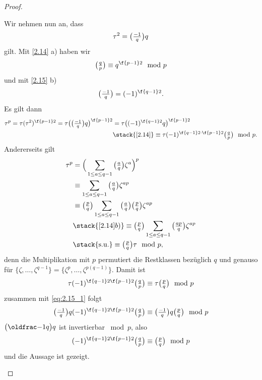 \begin{st}
\begin{proof}
\begin{enumerate}[a)]
				Wir nehmen nun an, dass
				\begin{equation} \label{eq:2.15_1}
					\tau^2 = \legsym {-1}q q
				\end{equation}
				gilt.
				Mit \ref{2.14} a) haben wir
				\[
					\legsym qp \equiv q^{\f {p-1}2} \mod p
				\]
				und mit \ref{2.15} b)
				\[
					\legsym {-1}q = (-1)^{\f {q-1}2}.
				\]
				Es gilt dann
				\begin{align*}
					\tau^p
					= \tau (\tau^2)^{\f{p-1}2}
					= \tau \big( \legsym {-1}q q \big)^{\f {p-1}2}
					&= \tau \big( (-1)^{\f {q-1}2} q \big)^{\f {p-1}2} \\
					&\stack{\ref{2.14}}\equiv \tau (-1)^{\f{q-1}2 \cdot \f {p-1}2} \legsym qp \mod p.
				\end{align*}
				Andererseits gilt
				\begin{align*}
					\tau^p
					&= \Big( \sum_{1 \le a \le q-1} \legsym aq \zeta^a \Big)^p \\
					&\equiv \sum_{1 \le a \le q-1} \legsym aq \zeta^{ap} \\
					&\equiv \legsym pq \sum_{1 \le a \le q-1} \legsym aq \legsym pq \zeta^{ap} \\
					&\stack{\ref{2.14} b)}\equiv \legsym pq \sum_{1 \le a \le q-1} \legsym {ap}q \zeta^{ap} \\
					&\stack{\text{s.u.}}\equiv \legsym pq \tau \mod p,
				\end{align*}
				denn die Multiplikation mit $p$ permutiert die Restklassen bezüglich $q$ und genauso für $\{\zeta, \dotsc, \zeta^{q-1}\} = \{\zeta^p, \dotsc, \zeta^{p(q-1)}\}$.
				Damit ist
				\[
					\tau (-1)^{\f{q-1}2 \f {p-1}2} \legsym qp
					\equiv \tau \legsym pq \mod p
				\]
				zusammen mit \eqref{eq:2.15_1} folgt
				\[
					\legsym {-1}q q (-1)^{\f{q-1}2 \f {p-1}2} \legsym qp
					\equiv \legsym {-1}q q \legsym pq \mod p
				\]
				$\legsym {-1}q q$ ist invertierbar $\bmod p$, also
				\[
					(-1)^{\f {q-1}2 \f {p-1}2} \legsym qp
					\equiv \legsym pq \mod p
				\]
				und die Aussage ist gezeigt.


\end{enumerate}
\end{proof}
\end{st}
